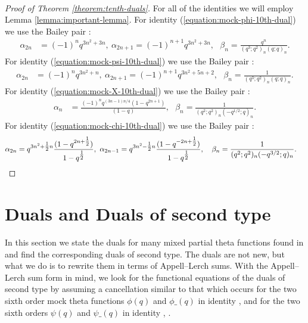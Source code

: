 \documentclass[12pt,reqno]{amsart}
\theoremstyle{remark}
\theoremstyle{definition}
\numberwithin{theorem}{section} \numberwithin{equation}{section}
\numberwithin{example}{section}
\begin{document}
{{\begin{align*}
\end{align*}}
\begin{proof}[Proof of Theorem \ref{theorem:tenth-duals}]  For all of the identities we will employ Lemma \ref{lemma:important-lemma}.   For identity (\ref{equation:mock-phi-10th-dual}) we use the Bailey pair \cite[C4]{S}:
\begin{align*}
\alpha_{2n}&=(-1)^nq^{3n^2+3n}, \ \alpha_{2n+1}=(-1)^{n+1}q^{3n^2+3n}, \ \ \ \beta_n=\frac{q^n}{(q^3;q^2)_n(q;q)_{n}}.
\end{align*}
For identity (\ref{equation:mock-psi-10th-dual}) we use the Bailey pair \cite[C3]{S}:
\begin{align*}
\alpha_{2n}&=(-1)^nq^{3n^2+n}, \ \alpha_{2n+1}=(-1)^{n+1}q^{3n^2+5n+2}, \ \ \ 
\beta_n=\frac{1}{(q^3;q^2)_n(q;q)_{n}}.
\end{align*}
For identity (\ref{equation:mock-X-10th-dual}) we use the Bailey pair \cite[$(4.4)$]{Wa1}:
\begin{align*}
\alpha_{n}&=\frac{(-1)^nq^{(3n-1)n/4}(1-q^{2n+1})}{(1-q)},\ \ \ \beta_n=\frac{1}{(q^2;q^2)_n(-q^{1/2};q)_{n}}.
\end{align*}
 For identity (\ref{equation:mock-chi-10th-dual}) we use the Bailey pair   \cite[G2]{S}:
\begin{align*}
\alpha_{2n}&=q^{3n^2+\tfrac{1}{2}n}\frac{(1-q^{2n+\tfrac{1}{2}})}{1-q^{\tfrac{1}{2}}},\ \alpha_{2n-1}=q^{3n^2-\tfrac{1}{2}n}\frac{(1-q^{-2n+\tfrac{1}{2}})}{1-q^{\tfrac{1}{2}}}, \ \ \ 
\beta_n=\frac{1}{(q^2;q^2)_n(-q^{3/2};q)_{n}}.\qedhere
\end{align*}
\end{proof}

\section{Duals and Duals of second type}\label{section:duals}

In this section we state the duals for many mixed partial theta functions found in \cite{RLN} and find the corresponding duals of second type.  The duals are not new, but what we do is to rewrite them in terms of Appell--Lerch sums.  With the Appell--Lerch sum form in mind, we look for the functional equations of the duals of second type by assuming a cancellation similar to that which occurs for the two sixth order mock theta functions $\phi(q)$ and $\phi \_(q)$ in identity \cite[Entry $3.4.1$]{ABII}, \cite[p. 6, 14]{RLN} and for the two sixth orders $\psi(q)$ and $\psi \_(q)$ in  identity \cite[Entry $3.4.2$]{ABII}, \cite[p. 14]{RLN}.

}
\end{document}

